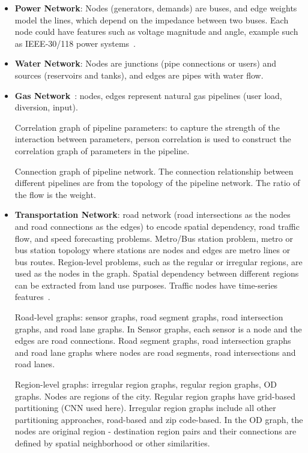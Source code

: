 \begin{itemize}[leftmargin=*]
    \item \textbf{Power Network}: Nodes (generators, demands) are buses, and edge weights model the lines, which depend on the impedance between two buses. Each node could have features such as voltage magnitude and angle, example such as IEEE-30/118 power systems~\cite{zimmerman2010matpower}.

    \item \textbf{Water Network}: Nodes are junctions (pipe connections or users) and sources (reservoirs and tanks), and edges are pipes with water flow.~\cite{xing2022graph}

    \item \textbf{Gas Network}~\cite{wang2024multiscale, yang2023graph}: nodes, edges represent natural gas pipelines (user load, diversion, input). 

    Correlation graph of pipeline parameters: to capture the strength of the interaction between parameters, person correlation is used to construct the correlation graph of parameters in the pipeline. 

    Connection graph of pipeline network. The connection relationship between different pipelines are from the topology of the pipeline network. The ratio of the flow is the weight.

    \item \textbf{Transportation Network}: road network (road intersections as the nodes and road connections as the edges) to encode spatial dependency, road traffic flow, and speed forecasting problems. Metro/Bus station problem, metro or bus station topology where stations are nodes and edges are metro lines or bus routes. Region-level problems, such as the regular or irregular regions, are used as the nodes in the graph. Spatial dependency between different regions can be extracted from land use purposes. Traffic nodes have time-series features~\cite{jiang2022graph}. 

    Road-level graphs: sensor graphs, road segment graphs, road intersection graphs, and road lane graphs. In Sensor graphs, each sensor is a node and the edges are road connections. Road segment graphs, road intersection graphs and road lane graphs where nodes are road segments, road intersections and road lanes. 

    Region-level graphs: irregular region graphs, regular region graphs, OD graphs. Nodes are regions of the city. Regular region graphs have grid-based partitioning (CNN used here). Irregular region graphs include all other partitioning approaches, road-based and zip code-based. In the OD graph, the nodes are original region - destination region pairs and their connections are defined by spatial neighborhood or other similarities.


\end{itemize}
